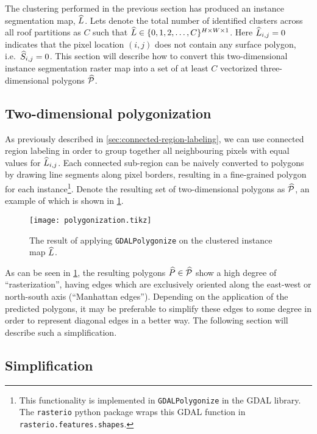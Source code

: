 The clustering performed in the previous section has produced an instance segmentation map, $\widehat{L}$.
Lets denote the total number of identified clusters across all roof partitions as $C$ such that $\widehat{L} \in \{0, 1, 2, \ldots, C\}^{H \times W \times 1}$.
Here $\widehat{L}_{i,j} = 0$ indicates that the pixel location $(i,j)$ does not contain any surface polygon, i.e.\ $\widehat{S}_{i,j} = 0$.
This section will describe how to convert this two-dimensional instance segmentation raster map into a set of at least $C$ vectorized three-dimensional polygons $\widehat{\mathcal{P}}$.

\subsection{Two-dimensional polygonization}

As previously described in \cref{sec:connected-region-labeling}, we can use connected region labeling in order to group together all neighbouring pixels with equal values for $\widehat{L}_{i,j}$.
Each connected sub-region can be naively converted to polygons by drawing line segments along pixel borders, resulting in a fine-grained polygon for each instance\footnote{This functionality is implemented in \texttt{GDALPolygonize} in the GDAL library. The \texttt{rasterio} python package wraps this GDAL function in \texttt{rasterio.features.shapes}.}.
Denote the resulting set of two-dimensional polygons as $\widehat{\mathcal{P}}$, an example of which is shown in \cref{fig:polygonization}.
\begin{figure}[H]
  \centering
  \texttt{[image: polygonization.tikz]}
  \caption{The result of applying \texttt{GDALPolygonize} on the clustered instance map $\widehat{L}$.}%
  \label{fig:polygonization}
\end{figure}
\noindent
As can be seen in \cref{fig:polygonization}, the resulting polygons $\widehat{P} \in \widehat{\mathcal{P}}$ show a high degree of \enquote{rasterization}, having edges which are exclusively oriented along the east-west or north-south axis (\enquote{Manhattan edges}).
Depending on the application of the predicted polygons, it may be preferable to simplify these edges to some degree in order to represent diagonal edges in a better way.
The following section will describe such a simplification.
\newpage

\subsection{Simplification}%
\label{sec:simplification}


